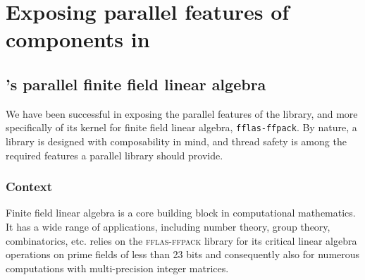 \documentclass{deliverablereport}
\author{Alexis Breust, Karim Belabas, Jean-Guillaume Dumas, Jeroen
  Demeyer, William B. Hart, Steve Linton, Clément Pernet, Reimer
  Behrends, Nicolas M. Thiéry, Hongguang Zhu}
\newcommand{\fflasffpack}{\textsc{fflas-ffpack}\xspace}
\begin{document}
\maketitle
\githubissuedescription
\tableofcontents
\clearpage



\section{Exposing parallel features of components in \SageMath}

\subsection{\Linbox's parallel finite field linear algebra}

We have been successful in exposing the parallel features of the \Linbox
library, and more specifically of its kernel for finite field linear algebra,
\texttt{fflas-ffpack}. By nature, a library is designed with composability in
mind, and thread safety is among the required features a parallel library should
provide.

\subsubsection{Context}

Finite field linear algebra is a core building block in computational mathematics.
It has a wide range of applications, including number theory, group theory, combinatorics, etc. \SageMath relies on the
\fflasffpack library for its critical linear algebra operations on prime fields of less than 23 bits and consequently
also for numerous computations with multi-precision integer matrices.  
\end{document}
